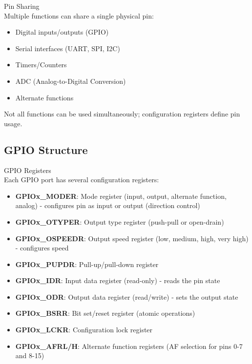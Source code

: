 \begin{definition}{Pin Sharing}\\
Multiple functions can share a single physical pin:
\begin{itemize}
    \item Digital inputs/outputs (GPIO)
    \item Serial interfaces (UART, SPI, I2C)
    \item Timers/Counters
    \item ADC (Analog-to-Digital Conversion)
    \item Alternate functions
\end{itemize}
Not all functions can be used simultaneously; configuration registers define pin usage.
\end{definition}

\subsection{GPIO Structure}

\begin{definition}{GPIO Registers}\\
Each GPIO port has several configuration registers:
\begin{itemize}
    \item \textbf{GPIOx\_MODER}: Mode register (input, output, alternate function, analog) - configures pin as input or output (direction control)
    \item \textbf{GPIOx\_OTYPER}: Output type register (push-pull or open-drain)
    \item \textbf{GPIOx\_OSPEEDR}: Output speed register (low, medium, high, very high) - configures speed
    \item \textbf{GPIOx\_PUPDR}: Pull-up/pull-down register
    \item \textbf{GPIOx\_IDR}: Input data register (read-only) - reads the pin state
    \item \textbf{GPIOx\_ODR}: Output data register (read/write) - sets the output state
    \item \textbf{GPIOx\_BSRR}: Bit set/reset register (atomic operations)
    \item \textbf{GPIOx\_LCKR}: Configuration lock register
    \item \textbf{GPIOx\_AFRL/H}: Alternate function registers (AF selection for pins 0-7 and 8-15)
\end{itemize}
\end{definition}

